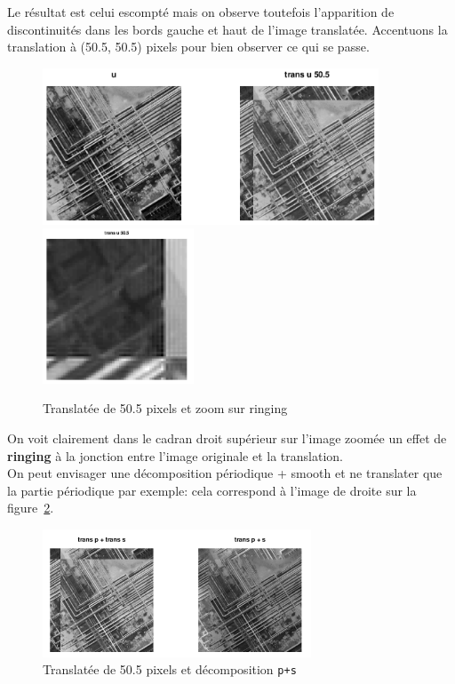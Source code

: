 \documentclass[a4paper, 11pt]{article}
\begin{document}
Le résultat est celui escompté mais on observe toutefois l'apparition de discontinuités dans les bords gauche et haut de
l'image translatée. Accentuons la translation à (50.5, 50.5) pixels pour bien observer ce qui se passe.

\begin{figure}[!h]
  \centering
  \includegraphics[width=10cm]{bouc_p_ffttrans_50.png}
  \hfill
  \includegraphics[width=4.5cm]{ringing_50.png}
  \caption{Translatée de 50.5 pixels et zoom sur ringing}
  \label{fig:bouc_50.5}
\end{figure}

On voit clairement dans le cadran droit supérieur sur l'image zoomée un effet de \textbf{ringing} à la jonction entre l'image
originale et la translation. \\

On peut envisager une décomposition périodique + \og smooth \fg et ne translater que la partie périodique par exemple:
cela correspond à l'image de droite sur la figure~\ref{fig:bouc_transp_s}.

\begin{figure}[!h]
  \centering
  \includegraphics[width=8cm]{bouc_perdecomp_trans_50.png}
  \caption{Translatée de 50.5 pixels et décomposition \texttt{p+s}}
  \label{fig:bouc_transp_s}
\end{figure}
\end{document}
